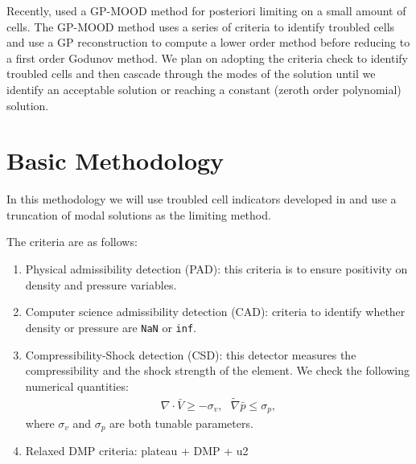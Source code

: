 \documentclass[11pt]{article}
\begin{document}
Recently, \cite{bourgeois2021gp} used a GP-MOOD method for posteriori limiting on a small amount of cells. The GP-MOOD method uses a series of criteria to identify troubled cells and use a GP reconstruction to compute a lower order method before reducing to a first order Godunov method. We plan on adopting the criteria check to identify troubled cells and then cascade through the modes of the solution until we identify an acceptable solution or reaching a constant (zeroth order polynomial) solution. 

\section{Basic Methodology}
In this methodology we will use troubled cell indicators developed in \cite{bourgeois2021gp} and use a truncation of modal solutions as the limiting method. 

The criteria are as follows:
\begin{enumerate}[label=(\alph*)]
    \item Physical admissibility detection (PAD): this criteria is to ensure positivity on density and pressure variables.
    \item Computer science admissibility detection (CAD): criteria to identify whether density or pressure are \texttt{NaN} or \texttt{inf}.
    \item Compressibility-Shock detection (CSD): this detector measures the compressibility and the shock strength of the element. We check the following numerical quantities:
    \begin{align}
        \nabla \cdot \bar{V} \geq -\sigma_v, ~~~ \tilde{\nabla}\bar{p} \leq \sigma_p,
    \end{align}
    where $\sigma_v$ and $\sigma_p$ are both tunable parameters.
    \item Relaxed DMP criteria: plateau + DMP + u2
\end{enumerate}
\end{document}
